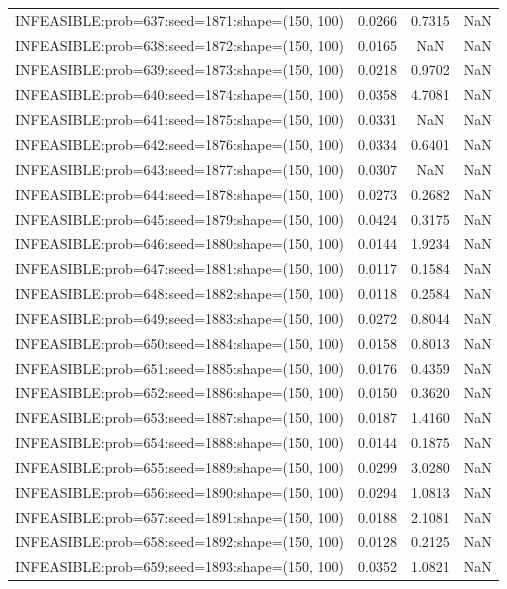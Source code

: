 \begin{longtable}{lccc}
INFEASIBLE:prob=637:seed=1871:shape=(150, 100) & 0.0266 &  0.7315 &    NaN \\
INFEASIBLE:prob=638:seed=1872:shape=(150, 100) & 0.0165 &     NaN &    NaN \\
INFEASIBLE:prob=639:seed=1873:shape=(150, 100) & 0.0218 &  0.9702 &    NaN \\
INFEASIBLE:prob=640:seed=1874:shape=(150, 100) & 0.0358 &  4.7081 &    NaN \\
INFEASIBLE:prob=641:seed=1875:shape=(150, 100) & 0.0331 &     NaN &    NaN \\
INFEASIBLE:prob=642:seed=1876:shape=(150, 100) & 0.0334 &  0.6401 &    NaN \\
INFEASIBLE:prob=643:seed=1877:shape=(150, 100) & 0.0307 &     NaN &    NaN \\
INFEASIBLE:prob=644:seed=1878:shape=(150, 100) & 0.0273 &  0.2682 &    NaN \\
INFEASIBLE:prob=645:seed=1879:shape=(150, 100) & 0.0424 &  0.3175 &    NaN \\
INFEASIBLE:prob=646:seed=1880:shape=(150, 100) & 0.0144 &  1.9234 &    NaN \\
INFEASIBLE:prob=647:seed=1881:shape=(150, 100) & 0.0117 &  0.1584 &    NaN \\
INFEASIBLE:prob=648:seed=1882:shape=(150, 100) & 0.0118 &  0.2584 &    NaN \\
INFEASIBLE:prob=649:seed=1883:shape=(150, 100) & 0.0272 &  0.8044 &    NaN \\
INFEASIBLE:prob=650:seed=1884:shape=(150, 100) & 0.0158 &  0.8013 &    NaN \\
INFEASIBLE:prob=651:seed=1885:shape=(150, 100) & 0.0176 &  0.4359 &    NaN \\
INFEASIBLE:prob=652:seed=1886:shape=(150, 100) & 0.0150 &  0.3620 &    NaN \\
INFEASIBLE:prob=653:seed=1887:shape=(150, 100) & 0.0187 &  1.4160 &    NaN \\
INFEASIBLE:prob=654:seed=1888:shape=(150, 100) & 0.0144 &  0.1875 &    NaN \\
INFEASIBLE:prob=655:seed=1889:shape=(150, 100) & 0.0299 &  3.0280 &    NaN \\
INFEASIBLE:prob=656:seed=1890:shape=(150, 100) & 0.0294 &  1.0813 &    NaN \\
INFEASIBLE:prob=657:seed=1891:shape=(150, 100) & 0.0188 &  2.1081 &    NaN \\
INFEASIBLE:prob=658:seed=1892:shape=(150, 100) & 0.0128 &  0.2125 &    NaN \\
INFEASIBLE:prob=659:seed=1893:shape=(150, 100) & 0.0352 &  1.0821 &    NaN \\

\end{longtable}
